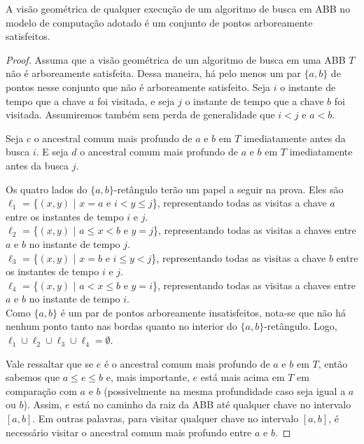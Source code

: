 \begin{lemma} A visão geométrica de qualquer execução de um algoritmo de busca em ABB no modelo de computação adotado é um conjunto de pontos arboreamente satisfeitos.
\label{lema:visao_geometrica_vira_ASS}
\end{lemma}

\begin{proof}
Assuma que a visão geométrica de um algoritmo de busca em uma ABB $T$ não é arboreamente satisfeita. Dessa maneira, há pelo menos um par $\{a,b\}$ de pontos nesse conjunto que não é arboreamente satisfeito. Seja $i$ o instante de tempo que a chave $a$ foi visitada, e seja $j$ o instante de tempo que a chave $b$ foi visitada. Assumiremos também sem perda de generalidade que $i < j$ e $a < b$.

Seja $c$ o ancestral comum mais profundo de $a$ e $b$ em $T$ imediatamente antes da busca $i$. E seja $d$ o ancestral comum mais profundo de $a$ e $b$ em $T$ imediatamente antes da busca $j$.

Os quatro lados do $\{a,b\}$-retângulo terão um papel a seguir na prova. Eles são\\
$\ell_1$ = \{$(x,y)$ | $x = a$ e $i < y \leq j$\}, representando todas as visitas a chave $a$ entre os instantes de tempo $i$ e $j$. \\
$\ell_2$ = \{$(x,y)$ | $a \leq x < b$ e $y = j$\}, representando todas as visitas a chaves entre $a$ e $b$ no instante de tempo $j$. \\
$\ell_3$ = \{$(x,y)$ | $x = b$ e $i \leq y < j$\}, representando todas as visitas a chave $b$ entre os instantes de tempo $i$ e $j$. \\
$\ell_4$ = \{$(x,y)$ | $a < x \leq b$ e $y = i$\}, representando todas as visitas a chaves entre $a$ e $b$ no instante de tempo $i$. \\

Como $\{a,b\}$ é um par de pontos arboreamente insatisfeitos, nota-se que não há nenhum ponto tanto nas bordas quanto no interior do $\{a,b\}$-retângulo. Logo, $\ell_1 \cup \ell_2 \cup \ell_3 \cup \ell_4 = \emptyset$.

Vale ressaltar que se $e$ é o ancestral comum mais profundo de $a$ e $b$ em $T$, então sabemos que $a \leq e \leq b$ e, mais importante, $e$ está mais acima em $T$ em comparação com $a$ e $b$ (possivelmente na mesma profundidade caso seja igual a $a$ ou $b$). Assim, $e$ está no caminho da raiz da ABB até qualquer chave no intervalo $[a,b]$. Em outras palavras, para visitar qualquer chave no intervalo $[a,b]$, é necessário visitar o ancestral comum mais profundo entre $a$ e $b$.


\end{proof}
